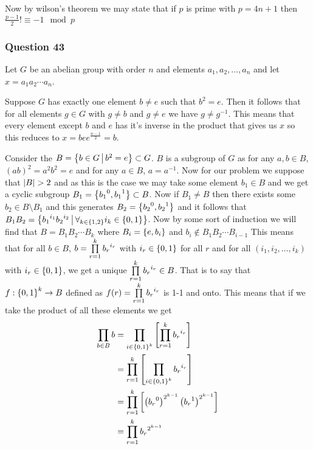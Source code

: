 \documentclass{article}
\begin{document}
Now by wilson's theorem we may state that if $p$ is prime with $p = 4n+1$ then $\frac{p-1}2! \equiv -1 \mod p$

\subsubsection{Question 43}

Let $G$ be an abelian group with order $n$ and elements $a_1,a_2,\ldots,a_n$ and let $x = a_1a_2\cdots a_n$.

 Suppose $G$ has exactly one element $b \not = e$ such that $b^2 = e$. Then it follows that for all elements $g \in G$ with $g \not = b$ and $g \not = e$ we have $g\not=g^{-1}$. This means that every element except $b$ and $e$ has it's inverse in the product that gives us $x$ so this reduces to $x = bee^{\frac{n-1}2} = b$.

 Consider the $B = \left\{{b \in G} \,\middle|\, {b^2 = e}\right\} \subset G$. $B$ is a subgroup of $G$ as for any $a,b \in B$, $(ab)^2 = a^2b^2 = e$ and for any $a \in B$, $a = a^{-1}$. Now for our problem we suppose that $\left| {B} \right| > 2$ and as this is the case we may take some element $b_1 \in B$ and we get a cyclic subgroup $B_1 = \left\{ {{b_1}^0,{b_1}^1} \right\} \subset B$. Now if $B_1 \not = B$ then there exists some $b_2 \in B\setminus B_1$ and this generates $B_2 = \left\{ {{b_2}^0,{b_2}^1} \right\}$ and it follows that $B_1B_2 = \left\{{{b_1}^{i_1}{b_2}^{i_2}} \,\middle|\, {\forall_{k\in\left\{ {1,2} \right\}} {i_k \in \left\{ {0,1} \right\}} }\right\}$. Now by some sort of induction we will find that $B = B_1B_2\cdots B_k$ where $B_i = \left\{ {e, b_i} \right\}$ and $b_i \not\in B_1B_2\cdots B_{i-1}$ This means that for all $b \in B$, $b = \prod\limits_{r = 1}^{k} {{b_r}^{i_r}} $ with $i_r \in \left\{ {0,1} \right\}$ for all $r$ and for all $(i_1,i_2,\ldots, i_k)$ with $i_r \in \left\{ {0,1} \right\}$, we get a unique $\prod\limits_{r=1}^{k} {{b_r}^{i_r}}  \in B$. That is to say that $f:\left\{ {0,1} \right\}^k \to B$ defined as $f(r) = \prod\limits_{r=1}^{k} {{b_r}^{i_r}} $ is 1-1 and onto. This means that if we take the product of all these elements we get
\begin{align*}
\prod\limits_{b \in B}^{} {b}  &= \prod\limits_{i \in \left\{ {0,1} \right\}^k}^{} {\left[\prod\limits_{r=1}^{k} {{b_r}^{i_r}} \right]}  \\
&= \prod\limits_{r = 1}^{k} {\left[\prod\limits_{i \in \left\{ {0,1} \right\}^k}^{} {{b_r}^{i_r}} \right]} \\
&= \prod\limits_{r = 1}^{k} {\left[\left({b_r}^0\right)^{2^{k-1}}\left({b_r}^1\right)^{2^{k-1}}\right]}  \\
&= \prod\limits_{r = 1}^{k} {{b_r}^{2^{k-1}}} 
\end{align*}
\end{document}
